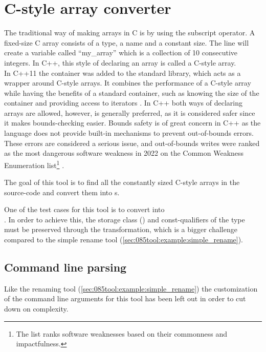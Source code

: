 
\section{C-style array converter}\label{sec:045tool:c_style_array}

The traditional way of making arrays in C is by using the subscript operator. A fixed-size C array consists of a type, a name and a constant size. The line  will create a variable called ``my\_array'' which is a collection of 10 consecutive integers.
In C++, this style of declaring an array is called a C-style array.\\
In C++11 the container  was added to the standard library, which acts as a wrapper around C-style arrays.
It combines the performance of a C-style array while having the benefits of a standard container, such as knowing the size of the container and providing access to iterators \cite{cppreferenceStdArrayCppreference}.
In C++ both ways of declaring arrays are allowed, however,  is generally preferred, as it is considered safer since it makes bounds-checking easier.
Bounds safety is of great concern in C++ as the language does not provide built-in mechanisms to prevent out-of-bounds errors.
These errors are considered a serious issue, and out-of-bounds writes were ranked as the most dangerous software weakness in 2022 on the Common Weakness Enumeration list\footnote{The list ranks software weaknesses based on their commonness and impactfulness.} \cite{mitreCWE2022CWE}.

The goal of this tool is to find all the constantly sized C-style arrays in the source-code and convert them into s.

One of the test cases for this tool is to convert  into \\. In order to achieve this, the storage class () and const-qualifiers of the type must be preserved through the transformation, which is a bigger challenge compared to the simple rename tool (\cref{sec:085tool:example:simple_rename}).

\subsection{Command line parsing}

Like the renaming tool (\cref{sec:085tool:example:simple_rename}) the customization of the command line arguments for this tool has been left out in order to cut down on complexity.

